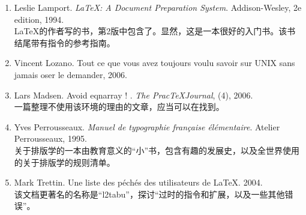 \begin{enumerate}
    关于\TeX 的\textbf{唯一}圣经。该书充满了``危险的转折''，十分详细第解释了\TeX 的内部机制。这是本相当难读的参考书，并且没有为初学者准备有关\TeX 的介绍——我认为是这样。
    \item Leslie Lamport. \emph{\LaTeX : A Document Preparation System}. Addison-Wesley, 2e edition, 1994.\\
    \LaTeX 的作者写的书，第2版中包含了\LaTeXe 。显然，这是一本很好的入门书。该书结尾带有指令的参考指南。
    \item Vincent Lozano. Tout ce que vous avez toujours voulu savoir sur UNIX sans jamais oser le demander, 2006. 
    \item Lars Madsen. Avoid eqnarray ! . \emph{The Prac\TeX Journal}, (4), 2006.\\
    一篇整理不使用该环境的理由的文章，应当可以在找到。
    \item Yves Perrousseaux. \emph{Manuel de typographie française élémentaire}. Atelier Perrousseaux, 1995.\\
    关于排版学的一本由教育意义的``小''书，包含有趣的发展史，以及全世界使用的关于排版学的规则清单。
    \item Mark Trettin. Une liste des péchés des utilisateurs de \LaTeX. 2004.\\
    该文档更著名的名称是``l2tabu''，探讨``过时的指令和扩展，以及一些其他错误''。
\end{enumerate}